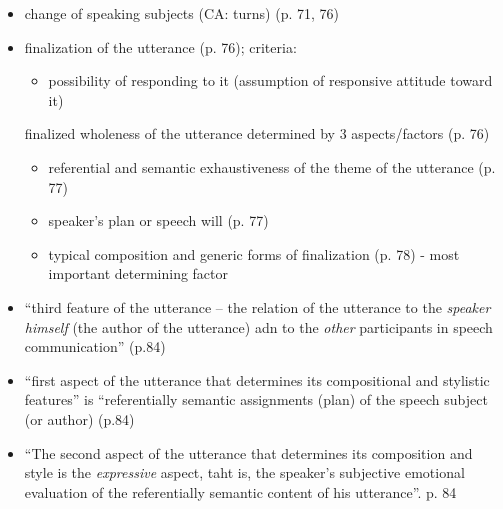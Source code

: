 \documentclass[11pt,twoside]{article}
\begin{document}
\begin{itemize}
\item change of speaking subjects (CA: turns) (p. 71, 76)
\item finalization of the utterance (p. 76); criteria:
\begin{itemize}
\item possibility of responding to it (assumption of responsive attitude toward it)
\end{itemize}
finalized wholeness of the utterance determined by 3 aspects/factors (p. 76)
\begin{itemize}
\item referential and semantic exhaustiveness of the theme of the utterance (p. 77)
\item speaker's plan or speech will (p. 77)
\item typical composition and generic forms of finalization (p. 78) - most important determining factor
\end{itemize}
\item ``third feature of the utterance -- the relation of the
  utterance to the \textit{speaker himself} (the author of the
  utterance) adn to the \textit{other} participants in speech
  communication'' (p.84)
\item ``first aspect of the utterance that determines its
  compositional and stylistic features'' is ``referentially semantic
  assignments (plan) of the speech subject (or author) (p.84)
\item ``The second aspect of the utterance that determines its
  composition and style is the \textit{expressive} aspect, taht is,
  the speaker's subjective emotional evaluation of the referentially
  semantic content of his utterance''. p. 84
\end{itemize}
\end{document}
